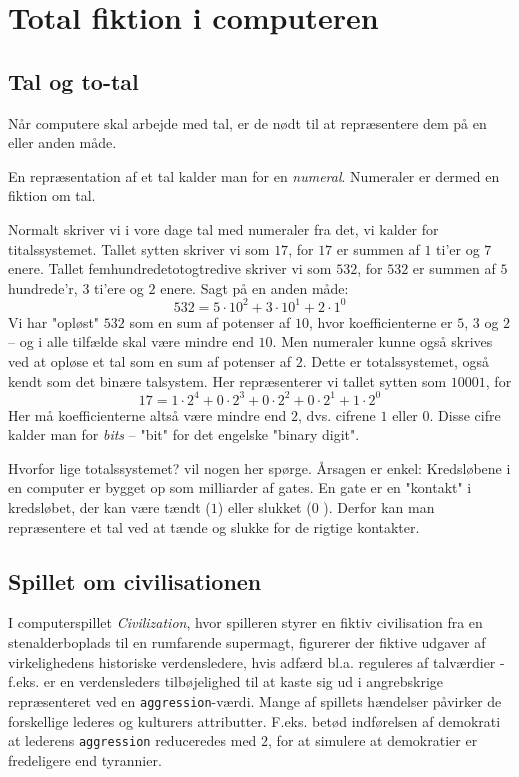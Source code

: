 \chapter{Total fiktion i computeren}

\section{Tal og to-tal}

Når computere skal arbejde med tal, er de nødt til at repræsentere dem på en eller anden måde.

En repræsentation af et tal kalder man for en \emph{numeral}. Numeraler er dermed en fiktion om tal.

Normalt skriver vi i vore dage tal med numeraler fra det, vi kalder for titalssystemet. Tallet sytten skriver vi som $17$, for $17$ er summen af $1$ ti'er og $7$ enere. Tallet femhundredetotogtredive skriver vi som $532$, for $532$ er summen af $5$ hundrede'r, $3$ ti'ere og $2$ enere. Sagt på en anden måde:
%
\[ 532 = 5 \cdot 10^2 + 3 \cdot 10^1 + 2 \cdot 1^0 \]
%
Vi har "opløst" $532$ som en sum af potenser af $10$, hvor koefficienterne er $5$, $3$ og $2$ -- og i alle tilfælde skal være mindre end $10$. Men numeraler kunne også skrives ved at opløse et tal som en sum af potenser af $2$. Dette er totalssystemet, også kendt som det binære talsystem. Her repræsenterer vi tallet sytten som $10001$, for
%
\[ 17 = 1 \cdot 2^4 + 0 \cdot 2^3 +  0 \cdot 2^2 +  0 \cdot 2^1 +  1 \cdot 2^0 \]
%
Her må koefficienterne altså være mindre end $2$, dvs. cifrene $1$ eller $0$. Disse cifre kalder man for \emph{bits} -- "bit" for det engelske "binary digit". 

Hvorfor lige totalssystemet? vil nogen her spørge. Årsagen er enkel: Kredsløbene i en computer er bygget op som milliarder af gates. En gate er en "kontakt" i kredsløbet, der kan være tændt ($1$) eller slukket ($0$
). Derfor kan man repræsentere et tal ved at tænde og slukke for de rigtige kontakter.

\section{Spillet om civilisationen}

I computerspillet \emph{Civilization}, hvor spilleren styrer en fiktiv civilisation fra en stenalderboplads til en rumfarende supermagt, figurerer der fiktive udgaver af virkelighedens historiske verdensledere, hvis adfærd bl.a. reguleres af talværdier - f.eks. er en verdensleders tilbøjelighed til at kaste sig ud i angrebskrige repræsenteret ved en \texttt{aggression}-værdi. Mange af spillets hændelser påvirker de forskellige lederes og kulturers attributter. F.eks. betød indførelsen af demokrati at lederens \texttt{aggression} reduceredes med $2$, for at simulere at demokratier er fredeligere end tyrannier.

